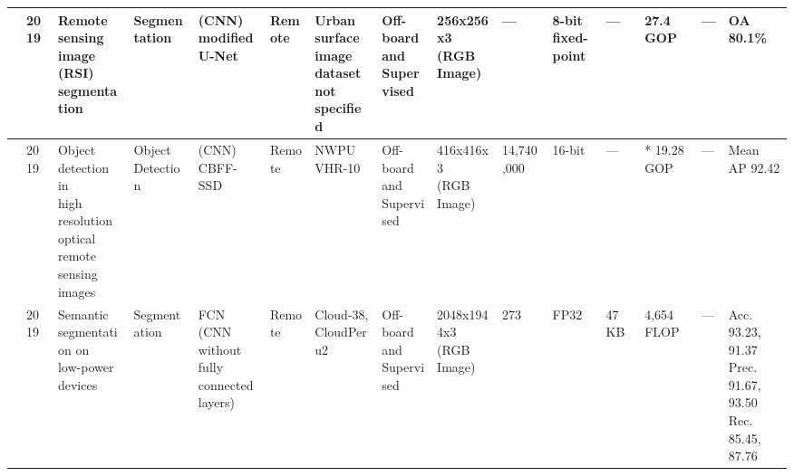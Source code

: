 \begin{center}
{\begin{tabular}{lllllllllllllll}
\cite{liuEfficientAcceleratorDNNBased2019} & 2019 & \makecell[tl]{Remote sensing \\image (RSI)\\ segmentation} & Segmentation & \makecell[tl]{(CNN)\\ modified U-Net} & Remote & \makecell[tl]{Urban surface\\ image dataset\\ not specified} & \makecell[tl]{Off-board\\ and\\ Supervised} & \makecell[tl]{256x256x3\\ (RGB Image)} & --- & \makecell[tl]{8-bit\\ fixed-point} & --- & 27.4 GOP & --- & OA 80.1\% \\ \hline
\cite{liEfficientObjectDetection2019} & 2019 & \makecell[tl]{Object detection in\\ high resolution\\ optical remote\\ sensing images} & \makecell[tl]{Object\\ Detection} & \makecell[tl]{(CNN)\\ CBFF-SSD} & Remote & NWPU VHR-10 & \makecell[tl]{Off-board\\ and\\ Supervised} & \makecell[tl]{416x416x3\\ (RGB Image)} & 14,740,000 & 16-bit & --- & * 19.28 GOP & --- & Mean AP 92.42 \\ 
\cite{bahlLowpowerNeuralNetworks2019} & 2019 & \makecell[tl]{Semantic\\ segmentation on\\ low-power devices} & Segmentation & \makecell[tl]{FCN (CNN\\ without fully\\ connected layers)} & Remote & \makecell[tl]{Cloud-38,\\ CloudPeru2} & \makecell[tl]{Off-board\\ and\\ Supervised} & \makecell[tl]{2048x1944x3\\ (RGB Image)} & 273 & FP32 & 47 KB & 4,654 FLOP & --- & \makecell[tl]{Acc.\\ 93.23, 91.37\\ Prec. \\91.67, 93.50\\ Rec. \\85.45, 87.76}  \\ \hline

\end{tabular}}
\end{center}
